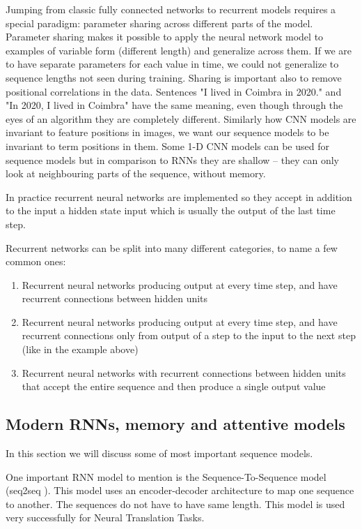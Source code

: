 \documentclass[b5paper]{book}
\let\cite\parencite
\begin{document}
Jumping from classic fully connected networks to recurrent models requires a special paradigm: parameter sharing across different parts of the model. Parameter sharing makes it possible to apply the neural network model to examples of variable form (different length) and generalize across them. If we are to have separate parameters for each value in time, we could not generalize to sequence lengths not seen during training. Sharing is important also to remove positional correlations in the data. Sentences "I lived in Coimbra in 2020." and "In 2020, I lived in Coimbra" have the same meaning, even though through the eyes of an algorithm they are completely different. Similarly how CNN models are invariant to feature positions in images, we want our sequence models to be invariant to term positions in them. Some 1-D CNN models can be used for sequence models but in comparison to RNNs they are shallow -- they can only look at neighbouring parts of the sequence, without memory.

In practice recurrent neural networks are implemented so they accept in addition to the input a hidden state input which is usually the output of the last time step.

Recurrent networks can be split into many different categories, to name a few common ones:

\begin{enumerate}
    \item Recurrent neural networks producing output at every time step, and have recurrent connections between hidden units
    \item Recurrent neural networks producing output at every time step, and have recurrent connections only from output of a step to the input to the next step (like in the example above)
    \item Recurrent neural networks with recurrent connections between hidden units that accept the entire sequence and then produce a single output value
 
\end{enumerate}

\subsection{Modern RNNs, memory and attentive models}

In this section we will discuss some of most important sequence models.

One important RNN model to mention is the Sequence-To-Sequence model (seq2seq \cite{sutskever2014sequence}). This model uses an encoder-decoder architecture to map one sequence to another. The sequences do not have to have same length. This model is used very successfully for Neural Translation Tasks.
\end{document}
